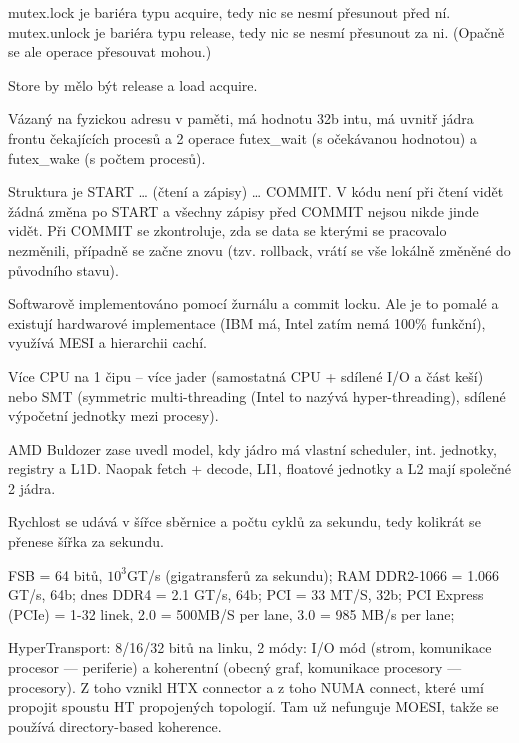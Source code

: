 \documentclass[12pt]{article}                   %
\begin{document}
        \begin{definice}
            mutex.lock je bariéra typu acquire, tedy nic se nesmí přesunout před ní. mutex.unlock je bariéra typu release, tedy nic se nesmí přesunout za ni. (Opačně se ale operace přesouvat mohou.)

            Store by mělo být release a load acquire.
        \end{definice}

        \begin{definice}[Futex]
            Vázaný na fyzickou adresu v paměti, má hodnotu 32b intu, má uvnitř jádra frontu čekajících procesů a 2 operace futex\_wait (s očekávanou hodnotou) a futex\_wake (s počtem procesů).
        \end{definice}

        \begin{definice}
            Struktura je START … (čtení a zápisy) … COMMIT. V kódu není při čtení vidět žádná změna po START a všechny zápisy před COMMIT nejsou nikde jinde vidět. Při COMMIT se zkontroluje, zda se data se kterými se pracovalo nezměnili, případně se začne znovu (tzv. rollback, vrátí se vše lokálně změněné do původního stavu).
            
            Softwarově implementováno pomocí žurnálu a commit locku. Ale je to pomalé a existují hardwarové implementace (IBM má, Intel zatím nemá 100\% funkční), využívá MESI a hierarchii cachí.
        \end{definice}


        \begin{poznamka}
            Více CPU na 1 čipu -- více jader (samostatná CPU + sdílené I/O a část keší) nebo SMT (symmetric multi-threading (Intel to nazývá hyper-threading), sdílené výpočetní jednotky mezi procesy).

            AMD Buldozer zase uvedl model, kdy jádro má vlastní scheduler, int. jednotky, registry a L1D. Naopak fetch + decode, LI1, floatové jednotky a L2 mají společné 2 jádra.
        \end{poznamka}

        \begin{definice}[Sběrnice]
            Rychlost se udává v šířce sběrnice a počtu cyklů za sekundu, tedy kolikrát se přenese šířka za sekundu.

            FSB = 64 bitů, $10^3$GT/s (gigatransferů za sekundu); RAM DDR2-1066 = 1.066 GT/s, 64b; dnes DDR4 = 2.1 GT/s, 64b; PCI = 33 MT/S, 32b; PCI Express (PCIe) = 1-32 linek, 2.0 = 500MB/S per lane, 3.0 = 985 MB/s per lane;

            HyperTransport: 8/16/32 bitů na linku, 2 módy: I/O mód (strom, komunikace procesor --- periferie) a koherentní (obecný graf, komunikace procesory --- procesory). Z toho vznikl HTX connector a z toho NUMA connect, které umí propojit spoustu HT propojených topologií. Tam už nefunguje MOESI, takže se používá directory-based koherence.
        \end{definice}
\end{document}
